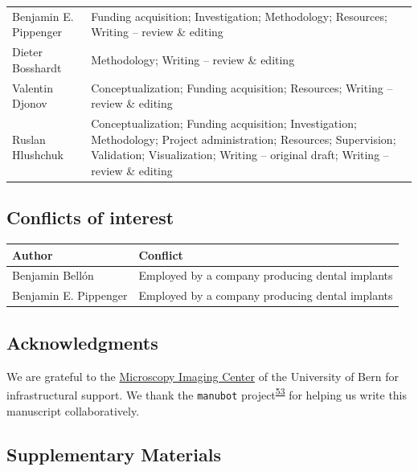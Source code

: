 \begin{tablenos:no-prefix-table-caption}
\begin{longtable}[]{@{}
  >{\raggedright\arraybackslash}p{}
  >{\raggedright\arraybackslash}p{}@{}}
Benjamin E. Pippenger & Funding acquisition; Investigation; Methodology; Resources; Writing -- review \& editing \\
Dieter Bosshardt & Methodology; Writing -- review \& editing \\
Valentin Djonov & Conceptualization; Funding acquisition; Resources; Writing -- review \& editing \\
Ruslan Hlushchuk & Conceptualization; Funding acquisition; Investigation; Methodology; Project administration; Resources; Supervision; Validation; Visualization; Writing -- original draft; Writing -- review \& editing \\
\bottomrule()
\end{longtable}

\end{tablenos:no-prefix-table-caption}

\hypertarget{conflicts-of-interest}{%
\subsection{Conflicts of interest}\label{conflicts-of-interest}}

\begin{tablenos:no-prefix-table-caption}

\begin{longtable}[]{@{}ll@{}}
\toprule()
Author & Conflict \\
\midrule()
\endhead
Benjamin Bellón & Employed by a company producing dental implants \\
Benjamin E. Pippenger & Employed by a company producing dental implants \\
\bottomrule()
\end{longtable}

\end{tablenos:no-prefix-table-caption}

\hypertarget{acknowledgments}{%
\subsection{Acknowledgments}\label{acknowledgments}}

We are grateful to the \href{https//www.mic.unibe.ch/}{Microscopy Imaging Center} of the University of Bern for infrastructural support.
We thank the \texttt{manubot} project\textsuperscript{\protect\hyperlink{ref-YuJbg3zO}{53}} for helping us write this manuscript collaboratively.

\hypertarget{supplementary-materials}{%
\subsection{Supplementary Materials}\label{supplementary-materials}}

